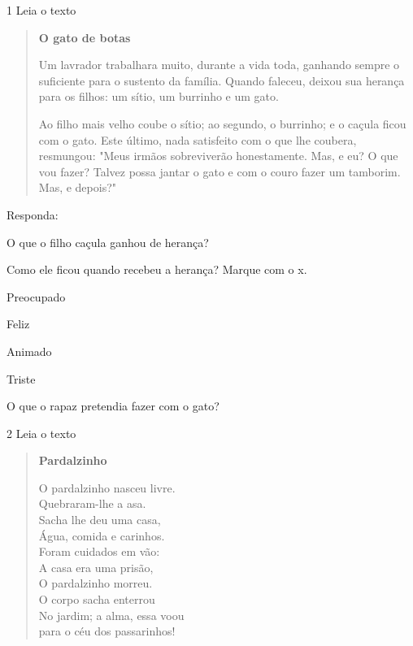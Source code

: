 
\num{1} Leia o texto

\begin{quote}
\textbf{O gato de botas}

Um lavrador trabalhara muito, durante a vida toda, ganhando sempre o
suficiente para o sustento da família. Quando faleceu, deixou sua
herança para os filhos: um sítio, um burrinho e um gato.

Ao filho mais velho coube o sítio; ao segundo, o
burrinho; e o caçula ficou com o gato.
Este último, nada satisfeito com o que lhe coubera,
resmungou: "Meus irmãos sobreviverão honestamente. Mas, e eu? O que vou
fazer? Talvez possa jantar o gato e com o couro fazer um tamborim. Mas,
e depois?"
\end{quote}


Responda:

\begin{escolha}
\item O que o filho caçula ganhou de herança?


\item Como ele ficou quando recebeu a herança? Marque com o x.

\begin{boxlist}
\boxitem[] Preocupado

\boxitem[] Feliz

\boxitem[] Animado

\boxitem[] Triste
\end{boxlist}

\item O que o rapaz pretendia fazer com o gato?

\end{escolha}

\num{2} Leia o texto

\begin{verse}
\textbf{Pardalzinho}

O pardalzinho nasceu livre.\\
Quebraram-lhe a asa.\\
Sacha lhe deu uma casa,\\
Água, comida e carinhos.\\
Foram cuidados em vão:\\
A casa era uma prisão,\\
O pardalzinho morreu.\\
O corpo sacha enterrou\\
No jardim; a alma, essa voou\\
para o céu dos passarinhos!
\end{verse}

